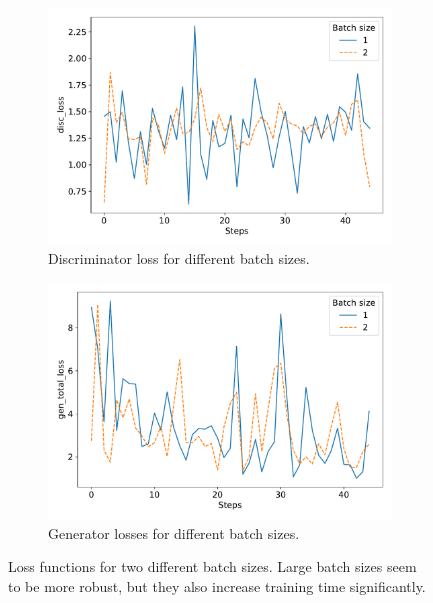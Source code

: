 \begin{figure}
	\centering
	\begin{subfigure}{0.5\linewidth}
		\centering
		\includegraphics[width=\textwidth]{fig/analysis/Plot_Batchsize_disc_loss.pdf}
		\caption{Discriminator loss for different batch sizes.}
		\label{fig:Plot_batchsize_discloss}
	\end{subfigure}\hfill
	\begin{subfigure}{0.5\linewidth}
		\centering
		\includegraphics[width=\textwidth]{fig/analysis/Plot_Batchsize_gen_total_loss.pdf}
		\caption{Generator losses for different batch sizes.}
		\label{fig:Plot_batchsize_genloss}
	\end{subfigure}\hfill
	\caption{Loss functions for two different batch sizes. Large batch sizes seem to be more robust, but they also increase training time significantly. }
	\label{fig:Plot_batchsize_loss}
\end{figure}
